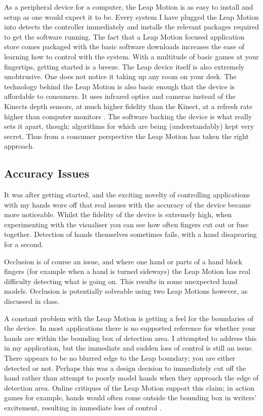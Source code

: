 \documentclass{sigplanconf}
\begin{document}
As a peripheral device for a computer, the Leap Motion is as easy to install and setup as one would expect it to be. Every system I have plugged the Leap Motion into detects the controller immediately and installs the relevant packages required to get the software running. The fact that a Leap Motion focused application store comes packaged with the basic software downloads increases the ease of learning how to control with the system. With a multitude of basic games at your fingertips, getting started is a breeze. The Leap device itself is also extremely unobtrusive. One does not notice it taking up any room on your desk. The technology behind the Leap Motion is also basic enough that the device is affordable to consumers. It uses infrared optics and cameras instead of the Kinects depth sensors, at much higher fidelity than the Kinect, at a refresh rate higher than computer monitors \cite{}. The software backing the device is what really sets it apart, though; algorithms for which are being (understandably) kept very secret. Thus from a consumer perspective the Leap Motion has taken the right approach. 

\subsection{Accuracy Issues}

It was after getting started, and the exciting novelty of controlling applications with my hands wore off that real issues with the accuracy of the device became more noticeable. Whilst the fidelity of the device is extremely high, when experimenting with the visualiser you can see how often fingers cut out or fuse together. Detection of hands themselves sometimes fails, with a hand disapearing for a second. 

Occlusion is of course an issue, and where one hand or parts of a hand block fingers (for example when a hand is turned sideways) the Leap Motion has real difficulty detecting what is going on. This results in some unexpected hand models. Occlusion is potentially solveable using two Leap Motions however, as discussed in class.

A constant problem with the Leap Motion is getting a feel for the boundaries of the device. In most applications there is no supported reference for whether your hands are within the bounding box of detection area. I attempted to address this in my application, but the immediate and sudden loss of control is still an issue. There appears to be no blurred edge to the Leap boundary; you are either detected or not. Perhaps this was a design decision to immediately cut off the hand rather than attempt to poorly model hands when they approach the edge of detection area. Online critiques of the Leap Motion support this claim; in action games for example, hands would often come outside the bounding box in writers' excitement, resulting in immediate loss of control \cite{}. 
\end{document}
